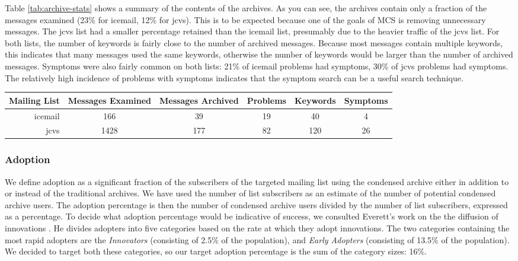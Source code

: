Table \ref{tab:archive-stats} shows a summary of the contents of the archives.
As you can see, the archives contain only a fraction of the messages examined
(23\% for icemail, 12\% for jcvs). This is to be expected because one of the
goals of MCS is removing unnecessary messages. The jcvs list had a smaller
percentage retained than the icemail list, presumably due to the heavier
traffic of the jcvs list. For both lists, the number of keywords is fairly
close to the number of archived messages. Because most messages contain
multiple keywords, this indicates that many messages used the same keywords,
otherwise the number of keywords would be larger than the number of archived
messages. Symptoms were also fairly common on both lists: 21\% of icemail
problems had symptoms, 30\% of jcvs problems had symptoms. The relatively high
incidence of problems with symptoms indicates that the symptom search can be a
useful search technique.

\begin{table*}[htbp]
  \begin{center}
    \begin{tabular} {|r|c|c|c|c|c|} \hline
      {\bf Mailing List} & {\bf Messages Examined} &
      {\bf Messages Archived} & {\bf Problems} &
      {\bf Keywords} & {\bf Symptoms}\\
      \hline\hline
      icemail & 166 & 39 & 19 & 40 & 4\\ \hline
      jcvs & 1428 & 177 & 82 & 120 & 26\\ \hline
    \end{tabular}
    \caption{Statistics on the composition of two condensed archives}
    \label{tab:archive-stats}
  \end{center}
\end{table*}

\subsubsection{Adoption}
We define adoption as a significant fraction of the subscribers of the targeted
mailing list using the condensed archive either in addition to or instead of
the traditional archives. We have used the number of list subscribers as an
estimate of the number of potential condensed archive users. The adoption
percentage is then the number of condensed archive users divided by the number
of list subscribers, expressed as a percentage. To decide what adoption
percentage would be indicative of success, we consulted Everett's work on the
the diffusion of innovations \cite{diffusion-innovations}. He divides adopters
into five categories based on the rate at which they adopt innovations. The two
categories containing the most rapid adopters are the {\em Innovators}
(consisting of 2.5\% of the population), and {\em Early Adopters} (consisting
of 13.5\% of the population). We decided to target both these categories, so
our target adoption percentage is the sum of the category sizes: 16\%.


